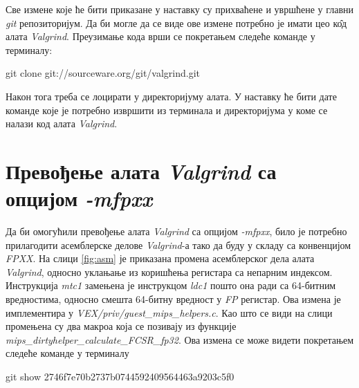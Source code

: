 \documentclass[12pt,oneside]{memoir}
\begin{document}
\indent Све измене које ће бити приказане у наставку су прихваћене и увршћене у главни \textit{git} репозиторијум. Да би могле да се виде ове измене потребно је имати цео к\^{о}д алата \textit{Valgrind}. Преузимање кода врши се покретањем следеће команде у терминалу:

\begin{center}
git clone git://sourceware.org/git/valgrind.git
\end{center}

Након тога треба се лоцирати у директоријуму алата. У наставку ће бити дате команде које је потребно извршити из терминала и директоријума у коме се налази код алата \textit{Valgrind}.

\section{Превођење алата \textit{Valgrind} са опцијом \textit{-mfpxx}}

\indent Да би омогућили превођење алата \textit{Valgrind} са опцијом \textit{-mfpxx}, било је потребно прилагодити асемблерске делове \textit{Valgrind}-а тако да буду у складу са конвенцијом \textit{FPXX}. На слици \ref{fig:asm} је приказана промена асемблерског дела алата \textit{Valgrind}, односно уклањање из коришћења регистара са непарним индексом. Инструкција \textit{mtc1} замењена је инструкцом \textit{ldc1} пошто она ради са 64-битним вредностима, односно смешта 64-битну вредност у \textit{FP} регистар. Ова измена је имплементира у \textit{VEX/priv/guest\_mips\_helpers.c}. Као што се види на слици промењена су два макроа која се позивају из функције \textit{mips\_dirtyhelper\_\-calculate\-\_FCSR\_fp32}. Ова измена се може видети покретањем следеће команде у терминалу

\begin{center}
git show 2746f7e70b2737b0744592409564463a9203c5f0
\end{center}
\end{document}
